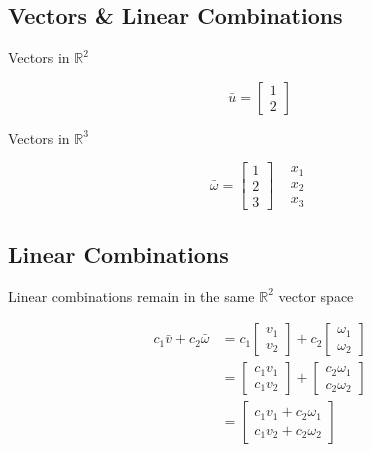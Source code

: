 \documentclass[main.tex]{subfiles}
\begin{document}
\subsection{Vectors \& Linear Combinations}

    Vectors in $\mathbb{R}^{2}$
    
    $$\bar{u}=\left[\begin{array}{l} 1 \\ 2\end{array}\right]$$
    
    Vectors in $\mathbb{R}^{3}$
    
    $$\bar{\omega}=\left[\begin{array}{l}1 \\ 2 \\ 3\end{array}\right] \begin{aligned}&x_{1} \\&x_{2} \\&x_{3}\end{aligned}$$

\subsection{Linear Combinations}

    Linear combinations remain in the same $\mathbb{R}^{2}$ vector space
    
    $$
    \begin{aligned}
    c_{1} \bar{v}+c_{2} \bar{\omega}
    & =c_{1}\left[\begin{array}{l}
    v_{1} \\
    v_{2}
    \end{array}\right]+c_{2}\left[\begin{array}{l}
    \omega_{1} \\
    \omega_{2}
    \end{array}\right]\\
    &=\left[\begin{array}{l}
    c_{1} v_{1} \\
    c_{1} v_{2}
    \end{array}\right]+\left[\begin{array}{l}
    c_{2} \omega_{1} \\
    c_{2} \omega_{2}
    \end{array}\right] \\
    &=\left[\begin{array}{l}
    c_{1} v_{1}+c_{2} \omega_{1} \\
    c_{1} v_{2}+c_{2} \omega_{2}
    \end{array}\right]
    \end{aligned}
    $$
    
\end{document}

